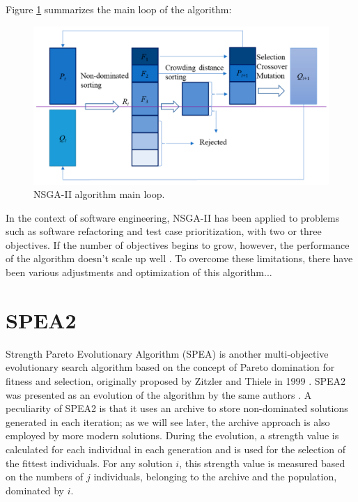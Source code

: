 Figure \ref{fig:NSGA-II algorithm main loop} summarizes the main loop of the algorithm:
\begin{figure}[!h]
    \centering
    \includegraphics[scale=0.1]{./figures/nsga-ii.png}
    \caption{NSGA-II algorithm main loop.}
    \label{fig:NSGA-II algorithm main loop}
\end{figure}


In the context of software engineering, NSGA-II has been applied to problems such as software refactoring and test case prioritization,
with two or three objectives. If the number of objectives begins to grow, however, the performance of the algorithm doesn't scale up well \cite{DBLP:journals/csur/LiLTY15}.
To overcome these limitations, there have been various adjustments and optimization of this algorithm...





\newpage
\section{SPEA2}
Strength Pareto Evolutionary Algorithm (SPEA) is another multi-objective evolutionary search algorithm based on the concept of Pareto domination for fitness and selection, originally proposed by Zitzler and Thiele in 1999 \cite{DBLP:journals/tec/ZitzlerT99}. SPEA2 was presented as an evolution of the algorithm by the same authors \cite{DBLP:journals/tec/ZitzlerT01}.
A  peculiarity of SPEA2 is that it uses an archive to store non-dominated solutions generated in each iteration; as we will see later, the archive approach is also employed by more modern solutions.
\newline \newline
During the evolution, a strength value is calculated for each individual in each generation and is used for the selection of the fittest individuals. For any solution $ i $, this strength value is measured based on the numbers of $ j $ individuals, belonging to the archive and the population, dominated by $ i $.
\newline 

